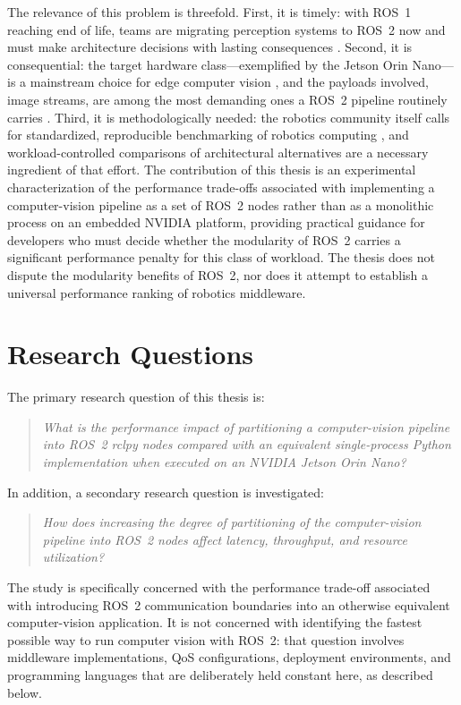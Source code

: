 The relevance of this problem is threefold. First, it is timely: with
ROS~1 reaching end of life, teams are migrating perception systems to
ROS~2 now and must make architecture decisions with lasting consequences
\cite{portugal2025}. Second, it is consequential: the target hardware
class---exemplified by the Jetson Orin Nano---is a mainstream choice for
edge computer vision \cite{scalcon2024, alqahtani2026}, and the payloads
involved, image streams, are among the most demanding ones a ROS~2
pipeline routinely carries \cite{kamiya2025, macenski2023}. Third, it is
methodologically needed: the robotics community itself calls for
standardized, reproducible benchmarking of robotics computing
\cite{mayoral-vilches2024}, and workload-controlled comparisons of
architectural alternatives are a necessary ingredient of that effort. The
contribution of this thesis is an experimental characterization of the
performance trade-offs associated with implementing a computer-vision
pipeline as a set of ROS~2 nodes rather than as a monolithic process on an
embedded NVIDIA platform, providing practical guidance for developers who
must decide whether the modularity of ROS~2 carries a significant
performance penalty for this class of workload. The thesis does not
dispute the modularity benefits of ROS~2, nor does it attempt to establish
a universal performance ranking of robotics middleware.

\section{Research Questions}
\label{sec:research-questions}

The primary research question of this thesis is:

\begin{quote}
\emph{What is the performance impact of partitioning a computer-vision
pipeline into ROS~2 rclpy nodes compared with an equivalent single-process
Python implementation when executed on an NVIDIA Jetson Orin Nano?}
\end{quote}

In addition, a secondary research question is investigated:

\begin{quote}
\emph{How does increasing the degree of partitioning of the
computer-vision pipeline into ROS~2 nodes affect latency, throughput, and
resource utilization?}
\end{quote}

The study is specifically concerned with the performance trade-off
associated with introducing ROS~2 communication boundaries into an
otherwise equivalent computer-vision application. It is not concerned with
identifying the fastest possible way to run computer vision with ROS~2:
that question involves middleware implementations, QoS configurations,
deployment environments, and programming languages that are deliberately
held constant here, as described below.


